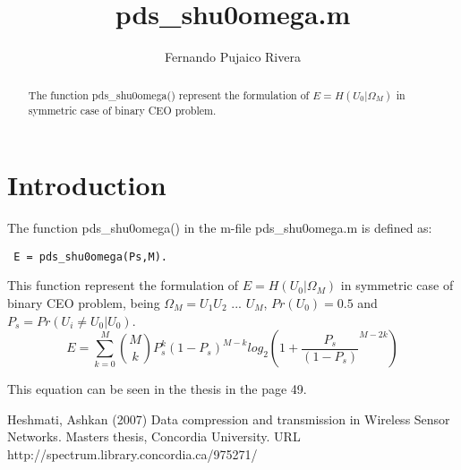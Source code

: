 \documentclass[a4paper,10pt]{article}
\title{pds\_shu0omega.m}
\author{Fernando Pujaico Rivera}
\begin{document}
\maketitle
\begin{abstract}
The function pds\_shu0omega() represent the formulation of $E = H(U_0|\Omega_M)$ 
in symmetric case of binary CEO problem.
\end{abstract}

\section{Introduction}
The function pds\_shu0omega() in the m-file pds\_shu0omega.m is defined as:
\lstset{language=octave}%
\begin{lstlisting}
 E = pds_shu0omega(Ps,M).
\end{lstlisting}
This function represent the formulation of $E=H(U_0|\Omega_M)$ in symmetric case 
of binary CEO problem,
being $\Omega_M=U_1 U_2$ $ ...$ $ U_M$, $Pr(U_0)=0.5$ and $P_s = Pr(U_i \neq U_0|U_0)$.
\begin{equation}
 E = \sum_{k=0}^M \binom{M}{k} P_s^k (1-P_s)^{M-k} log_2\left ( 1 +  {\frac{P_s}{(1-P_s)}}^{M-2k} \right )
\end{equation}

This equation can be seen in the thesis \cite{shu0omega} in the page 49.

\begin{thebibliography}{99}
 
  Heshmati, Ashkan   (2007) Data compression and transmission in Wireless Sensor Networks.  
  Masters thesis, Concordia University. URL http://spectrum.library.concordia.ca/975271/ 

\end{thebibliography}  
\end{document}
